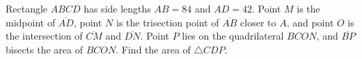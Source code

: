 Rectangle $ABCD$ has side lengths $AB=84$ and $AD=42$. Point $M$ is the midpoint of $\overline{AD}$, point $N$ is the trisection point of $\overline{AB}$ closer to $A$, and point $O$ is the intersection of $\overline{CM}$ and $\overline{DN}$. Point $P$ lies on the quadrilateral $BCON$, and $\overline{BP}$ bisects the area of $BCON$. Find the area of $\triangle{CDP}$.